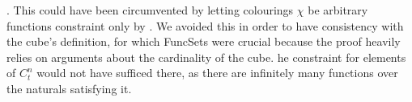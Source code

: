 \begin{isabellebody}
\begin{isamarkuptext}
. This could have been circumvented by letting colourings $\chi$ be
arbitrary functions constraint only by . We avoided this in
order to have consistency with the cube's definition, for which FuncSets were crucial because the proof heavily relies
on arguments about the cardinality of the cube. he constraint  for
elements  of $C^n_t$ would not have sufficed there, as there are infinitely many functions over the
naturals satisfying it.%
\end{isamarkuptext}\isamarkuptrue%
%
\isadelimtheory
%
\endisadelimtheory
%
\isatagtheory
{}\isamarkupfalse%
%
\endisatagtheory
{\isafoldtheory}%
%
\isadelimtheory
%
\endisadelimtheory
%
\end{isabellebody}%
\endinput
